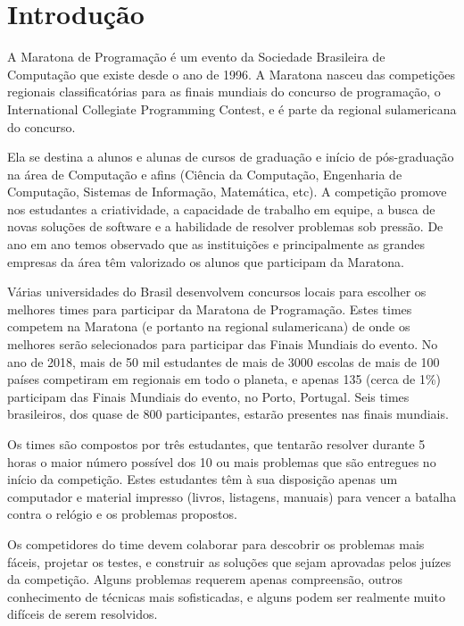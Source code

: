 \newpage

\section{Introdução}

A Maratona de Programação é um evento da Sociedade Brasileira de Computação que existe desde o ano de 1996. A Maratona nasceu das competições regionais classificatórias para as finais mundiais do concurso de programação, o International Collegiate Programming Contest, e é parte da regional sulamericana do concurso.

Ela se destina a alunos e alunas de cursos de graduação e início de pós-graduação na área de Computação e afins (Ciência da Computação, Engenharia de Computação, Sistemas de Informação, Matemática, etc). A competição promove nos estudantes a criatividade, a capacidade de trabalho em equipe, a busca de novas soluções de software e a habilidade de resolver problemas sob pressão. De ano em ano temos observado que as instituições e principalmente as grandes empresas da área têm valorizado os alunos que participam da Maratona.

Várias universidades do Brasil desenvolvem concursos locais para escolher os melhores times para participar da Maratona de Programação. Estes times competem na Maratona (e portanto na regional sulamericana) de onde os melhores serão selecionados para participar das Finais Mundiais do evento. No ano de 2018, mais de 50 mil estudantes de mais de 3000 escolas de mais de 100 países competiram em regionais em todo o planeta, e apenas 135 (cerca de 1\%) participam das Finais Mundiais do evento, no Porto, Portugal. Seis times brasileiros, dos quase de 800 participantes, estarão presentes nas finais mundiais.

Os times são compostos por três estudantes, que tentarão resolver durante 5 horas o maior número possível dos 10 ou mais problemas que são entregues no início da competição. Estes estudantes têm à sua disposição apenas um computador e material impresso (livros, listagens, manuais) para vencer a batalha contra o relógio e os problemas propostos.

Os competidores do time devem colaborar para descobrir os problemas mais fáceis, projetar os testes, e construir as soluções que sejam aprovadas pelos juízes da competição. Alguns problemas requerem apenas compreensão, outros conhecimento de técnicas mais sofisticadas, e alguns podem ser realmente muito difíceis de serem resolvidos.

